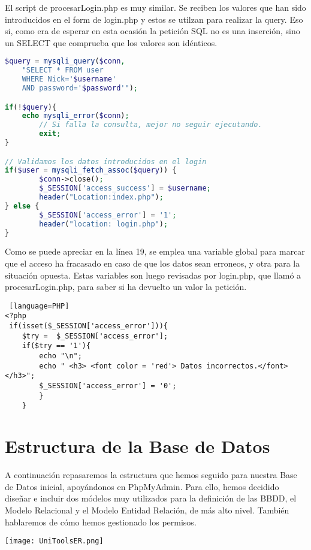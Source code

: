 \documentclass[12pt]{report}
\begin{document}
El script de procesarLogin.php es muy similar. Se reciben los valores que han sido introducidos en el form de login.php y estos se utilzan para realizar la query. Eso si, como era de esperar en esta ocasión la petición SQL no es una inserción, sino un SELECT que comprueba que los valores son idénticos.
\newline
\begin{lstlisting}[language=PHP]
$query = mysqli_query($conn, 
    "SELECT * FROM user 
    WHERE Nick='$username' 
    AND password='$password'");

if(!$query){ 
    echo mysqli_error($conn);
        // Si falla la consulta, mejor no seguir ejecutando.
        exit;
} 

// Validamos los datos introducidos en el login
if($user = mysqli_fetch_assoc($query)) {
        $conn->close();
        $_SESSION['access_success'] = $username;
        header("Location:index.php");
} else {
        $_SESSION['access_error'] = '1';
        header("location: login.php");
}
\end{lstlisting}

Como se puede apreciar en la línea 19, se emplea una variable global para marcar que el acceso ha fracasado en caso de que los datos sean erroneos, y otra para la situación opuesta. Estas variables son luego revisadas por login.php, que llamó a procesarLogin.php, para saber si ha devuelto un valor la petición.
\newline
\begin{lstlisting} [language=PHP]
<?php
 if(isset($_SESSION['access_error'])){
    $try =  $_SESSION['access_error'];
    if($try == '1'){
        echo "\n";
        echo " <h3> <font color = 'red'> Datos incorrectos.</font> </h3>";
        $_SESSION['access_error'] = '0';
        }
    }
\end{lstlisting}

\newpage
\section{Estructura de la Base de Datos}
A continuación repasaremos la estructura que hemos seguido para nuestra Base de Datos inicial, apoyándonos en PhpMyAdmin. Para ello, hemos decidido diseñar e incluir dos módelos muy utilizados para la definición de las BBDD, el Modelo Relacional y el Modelo Entidad Relación, de más alto nivel. También hablaremos de cómo hemos gestionado los permisos.
\newline


\texttt{[image: UniToolsER.png]}
\end{document}
